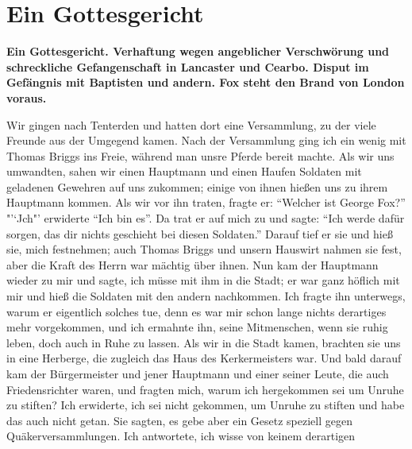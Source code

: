 

\chapter[Ein Gottesgericht]{Ein Gottesgericht}

\begin{center}
\textbf{Ein Gottesgericht. Verhaftung wegen angeblicher Verschwörung
und schreckliche Gefangenschaft in Lancaster und Cearbo. Disput
im Gefängnis mit Baptisten und andern. Fox steht den Brand
von London voraus.}
\end{center}

Wir gingen nach Tenterden und hatten dort eine Versammlung, 
zu der viele Freunde aus der Umgegend kamen. Nach der
Versammlung ging ich ein wenig mit Thomas Briggs ins Freie,
während man unsre Pferde bereit machte. Als wir uns umwandten, 
sahen wir einen Hauptmann und einen Haufen Soldaten
mit geladenen Gewehren auf uns zukommen; einige von ihnen
hießen uns zu ihrem Hauptmann kommen. Als wir vor ihn
traten, fragte er: "`Welcher ist George Fox?"' "'`Jch"' erwiderte
"`Ich bin es"'. Da trat er auf mich zu und sagte: "`Ich werde
dafür sorgen, das dir nichts geschieht bei diesen Soldaten."' 
Darauf tief er sie und hieß sie, mich festnehmen; auch Thomas
Briggs und unsern Hauswirt nahmen sie fest, aber die Kraft des
Herrn war mächtig über ihnen. Nun kam der Hauptmann
wieder zu mir und sagte, ich müsse mit ihm in die Stadt;
er war ganz höflich mit mir und hieß die Soldaten mit den
andern nachkommen. Ich fragte ihn unterwegs, warum er
eigentlich solches tue, denn es war mir schon lange nichts 
derartiges mehr vorgekommen, und ich ermahnte ihn, seine Mitmenschen,
wenn sie ruhig leben, doch auch in Ruhe zu lassen. Als wir in
die Stadt kamen, brachten sie uns in eine Herberge, die zugleich
das Haus des Kerkermeisters war. Und bald darauf kam der
Bürgermeister und jener Hauptmann und einer seiner Leute, die
auch Friedensrichter waren, und fragten mich, warum ich 
hergekommen sei um Unruhe zu stiften? Ich erwiderte, ich sei nicht
gekommen, um Unruhe zu stiften und habe das auch nicht getan.
Sie sagten, es gebe aber ein Gesetz speziell gegen 
Quäkerversammlungen. Ich antwortete, ich wisse von keinem derartigen

